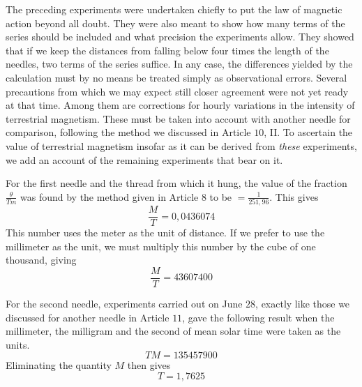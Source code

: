The preceding experiments were undertaken chiefly to put the law of magnetic action beyond all doubt. They were also meant to show how many terms of the series should be included and what precision the experiments allow. They showed that if we keep the distances from falling below four times the length of the needles, two terms of the series suffice. In any case, the differences yielded by the calculation must by no means be treated simply as observational errors. Several precautions from which we may expect still closer agreement were not yet ready at that time. Among them are corrections for hourly variations in the intensity of terrestrial magnetism. These must be taken into account with another needle for comparison, following the method we discussed in Article $10$, II. To ascertain the value of terrestrial magnetism insofar as it can be derived from \textit{these} experiments, we add an account of the remaining experiments that bear on it.

For the first needle and the thread from which it hung, the value of the fraction $\frac{\theta}{Tm}$ was found by the method given in Article $8$ to be $=\frac{1}{251{,}96}$. This gives
\[
\frac MT=0{,}0436074
\]
This number uses the meter as the unit of distance. If we prefer to use the millimeter as the unit, we must multiply this number by the cube of one thousand, giving
\[
\frac MT=43607400
\]

For the second needle, experiments carried out on June $28$, exactly like those we discussed for another needle in Article $11$, gave the following result when the millimeter, the milligram and the second of mean solar time were taken as the units.
\[
TM=135457900
\]
Eliminating the quantity $M$ then gives
\[
T=1{,}7625
\]
